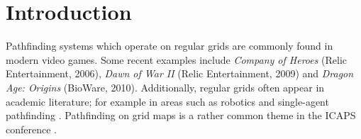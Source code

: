 \section{Introduction}
Pathfinding systems which operate on regular grids are commonly found in modern video games.
Some recent examples include \emph{Company of Heroes} (Relic Entertainment, 2006), \emph{Dawn of War II} (Relic
Entertainment, 2009) and \emph{Dragon Age: Origins} (BioWare, 2010).
Additionally, regular grids often appear in academic literature; for example in areas such as robotics \cite{choset05} and
single-agent pathfinding \cite{botea04,bjornsson06,sturtevant07}.
Pathfinding on grid maps is a rather common theme in the ICAPS conference
\cite{DBLP:conf/aips/HernandezMSK09,DBLP:conf/aips/ThayerR09,DBLP:conf/aips/WangB08,DBLP:conf/aips/ThayerR08,DBLP:conf/aips/BulitkoBLSS07}.


